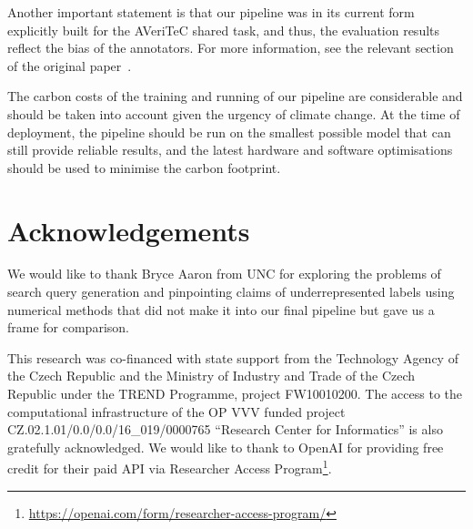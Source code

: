 \documentclass[11pt]{article}
\newcommand{\review}[1]{{\color{black}#1}}
\newcommand{\averitec}{AVeriTeC}
\begin{document}
Another important statement is that our pipeline was in its current form explicitly built for the \averitec{} shared task, and thus, the evaluation results reflect the bias of the annotators. For more information, see the relevant section of the original paper~\cite{averitec2024}.

The carbon costs of the training and running of our pipeline are considerable and should be taken into account given the urgency of climate change. At the time of deployment, the pipeline should be run on the smallest possible model that can still provide reliable results, and the latest hardware and software optimisations should be used to minimise the carbon footprint.

\section*{Acknowledgements}
We would like to thank Bryce Aaron from UNC for exploring the problems of search query generation and pinpointing claims of underrepresented labels using numerical methods that did not make it into our final pipeline but gave us a frame for comparison. 

This research was co-financed with state support from the Technology Agency of the Czech Republic and the Ministry of Industry and Trade of the Czech Republic under the TREND Programme, project FW10010200.
The access to the computational infrastructure of the OP VVV funded project CZ.02.1.01/0.0/0.0/16\_019/0000765 ``Research Center for Informatics'' is also gratefully acknowledged.
We would like to thank to \mbox{OpenAI} for providing free credit for their paid API via Researcher Access Program\footnote{\review{\url{https://openai.com/form/researcher-access-program/}}}.






\appendix


%

\end{document}
